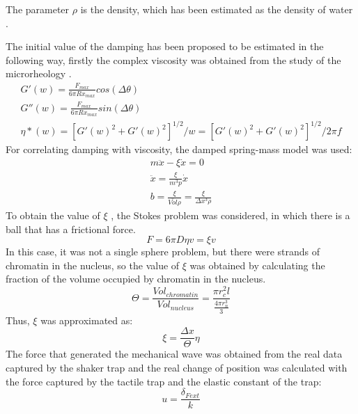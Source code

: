 \documentclass[12pt, a4paper]{article} %
\begin{document}
	The parameter $\rho$ is the density, which has been estimated as the density of water \cite{patterson1994measurement}. 
	
	The initial value of the damping has been proposed to be estimated in the following way, firstly the complex viscosity was obtained from the study of the microrheology \cite{el2008measuring, robertson2018optical}. 
	\begin{equation} \label{eqn:microreology}
		\begin{array}{ l }
			
			G'(w) = \frac{F_{max}}{6\pi R x_{max}} cos(\Delta \theta) \\
			G''(w) = \frac{F_{max}}{6\pi R x_{max}} sin(\Delta \theta) \\
			\eta *(w) = [G'(w)^{2}+G'(w)^{2}]^{1/2}/w = [G'(w)^{2}+G'(w)^{2}]^{1/2}/2\pi f
			
		\end{array}
	\end{equation}
	For correlating damping with viscosity, the damped spring-mass model was used:
	\begin{equation} \label{eqn:modelo_masa_resorte}
		\begin{array}{ l }
			
			m\ddot{x} - \xi \dot{x} = 0 \\
			\ddot{x} = \frac{\xi}{m^{3}p}\dot{x} \\
			b = \frac{\xi}{\bar{Vol} \rho} = \frac{\xi}{\Delta x^{3} \rho}
			
		\end{array}
	\end{equation}
	To obtain the value of $\xi$ , the Stokes problem was considered, in which there is a ball that has a frictional force.
	\begin{equation} \label{eqn:stokes}
		F = 6\pi D \eta v = \xi v
	\end{equation}
	In this case, it was not a single sphere problem, but there were strands of chromatin in the nucleus, so the value of $\xi$ was obtained by calculating the fraction of the volume occupied by chromatin in the nucleus.
	\begin{equation} \label{eqn:frac_nucl_chro}
		\Theta = \frac{Vol_{chromatin}}{Vol_{nucleus}} = \frac{\pi r_{c}^{2} l}{\frac{4\pi r_{n}^{3}}{3}}
	\end{equation}
	Thus, $\xi$ was approximated as:
	\begin{equation} \label{eqn:xi_approx}
		\xi = \frac{\Delta x}{\Theta} \eta
	\end{equation}
	The force that generated the mechanical wave was obtained from the real data captured by the shaker trap and the real change of position was calculated with the force captured by the tactile trap and the elastic constant of the trap:
	\begin{equation} \label{eqn:real_desp}
		u = \frac{\delta_{Fext}}{k}
	\end{equation}
	\newpage
	\setlength{\parskip}{0mm}
	
\end{document}
